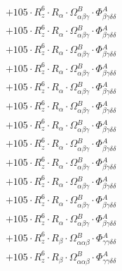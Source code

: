 \documentclass{article}
\begin{document}
\begin{subequations}
\begin{gather}
\begin{array}{c}
 \\[0.2em] 		 + 105 \cdot R_{z}^{6} \cdot R_{\alpha{}} \cdot \Omega{}^{B}_{\alpha{}\beta{}\gamma{}} \cdot \Phi{}^{A}_{\beta{}\gamma{}\delta{}\delta{}} 
 \\[0.2em] 		 + 105 \cdot R_{z}^{6} \cdot R_{\alpha{}} \cdot \Omega{}^{B}_{\alpha{}\beta{}\gamma{}} \cdot \Phi{}^{A}_{\beta{}\gamma{}\delta{}\delta{}} 
 \\[0.2em] 		 + 105 \cdot R_{z}^{6} \cdot R_{\alpha{}} \cdot \Omega{}^{B}_{\alpha{}\beta{}\gamma{}} \cdot \Phi{}^{A}_{\beta{}\gamma{}\delta{}\delta{}} 
 \\[0.2em] 		 + 105 \cdot R_{z}^{6} \cdot R_{\alpha{}} \cdot \Omega{}^{B}_{\alpha{}\beta{}\gamma{}} \cdot \Phi{}^{A}_{\beta{}\gamma{}\delta{}\delta{}} 
 \\[0.2em] 		 + 105 \cdot R_{z}^{6} \cdot R_{\alpha{}} \cdot \Omega{}^{B}_{\alpha{}\beta{}\gamma{}} \cdot \Phi{}^{A}_{\beta{}\gamma{}\delta{}\delta{}} 
 \\[0.2em] 		 + 105 \cdot R_{z}^{6} \cdot R_{\alpha{}} \cdot \Omega{}^{B}_{\alpha{}\beta{}\gamma{}} \cdot \Phi{}^{A}_{\beta{}\gamma{}\delta{}\delta{}} 
 \\[0.2em] 		 + 105 \cdot R_{z}^{6} \cdot R_{\alpha{}} \cdot \Omega{}^{B}_{\alpha{}\beta{}\gamma{}} \cdot \Phi{}^{A}_{\beta{}\gamma{}\delta{}\delta{}} 
 \\[0.2em] 		 + 105 \cdot R_{z}^{6} \cdot R_{\alpha{}} \cdot \Omega{}^{B}_{\alpha{}\beta{}\gamma{}} \cdot \Phi{}^{A}_{\beta{}\gamma{}\delta{}\delta{}} 
 \\[0.2em] 		 + 105 \cdot R_{z}^{6} \cdot R_{\alpha{}} \cdot \Omega{}^{B}_{\alpha{}\beta{}\gamma{}} \cdot \Phi{}^{A}_{\beta{}\gamma{}\delta{}\delta{}} 
 \\[0.2em] 		 + 105 \cdot R_{z}^{6} \cdot R_{\alpha{}} \cdot \Omega{}^{B}_{\alpha{}\beta{}\gamma{}} \cdot \Phi{}^{A}_{\beta{}\gamma{}\delta{}\delta{}} 
 \\[0.2em] 		 + 105 \cdot R_{z}^{6} \cdot R_{\alpha{}} \cdot \Omega{}^{B}_{\alpha{}\beta{}\gamma{}} \cdot \Phi{}^{A}_{\beta{}\gamma{}\delta{}\delta{}} 
 \\[0.2em] 		 + 105 \cdot R_{z}^{6} \cdot R_{\alpha{}} \cdot \Omega{}^{B}_{\alpha{}\beta{}\gamma{}} \cdot \Phi{}^{A}_{\beta{}\gamma{}\delta{}\delta{}} 
 \\[0.2em] 		 + 105 \cdot R_{z}^{6} \cdot R_{\beta{}} \cdot \Omega{}^{B}_{\alpha{}\alpha{}\beta{}} \cdot \Phi{}^{A}_{\gamma{}\gamma{}\delta{}\delta{}} 
 \\[0.2em] 		 + 105 \cdot R_{z}^{6} \cdot R_{\beta{}} \cdot \Omega{}^{B}_{\alpha{}\alpha{}\beta{}} \cdot \Phi{}^{A}_{\gamma{}\gamma{}\delta{}\delta{}} 

\end{array}
\end{gather}
\end{subequations}
\end{document}
